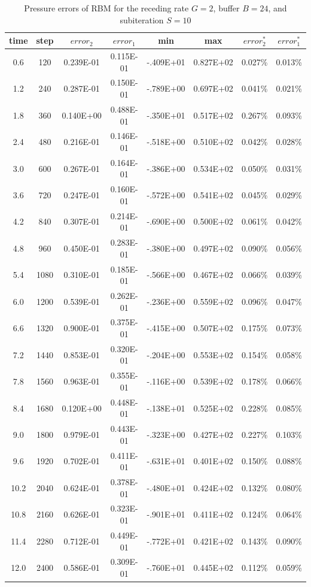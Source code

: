 \cp

 \begin{table}[hbtp]%
\vspace{0.6in}
 \begin{center}
\caption{Pressure errors of RBM for the receding rate $G=2$, buffer $B=24$, and subiteration $S=10$} %
\small
 \begin{tabular}{cccccccc} \hline %
 time & step & $error_{2}$ & $error_{1}$ &  min & max &  $error_{2}^*$ & $error_{1}^*$ \\ \hline
  0.6 &   120 & 0.239E-01 & 0.115E-01 & -.409E+01 & 0.827E+02 &   0.027\% &   0.013\%  \\
  1.2 &   240 & 0.287E-01 & 0.150E-01 & -.789E+00 & 0.697E+02 &   0.041\% &   0.021\%  \\
  1.8 &   360 & 0.140E+00 & 0.488E-01 & -.350E+01 & 0.517E+02 &   0.267\% &   0.093\%  \\
  2.4 &   480 & 0.216E-01 & 0.146E-01 & -.518E+00 & 0.510E+02 &   0.042\% &   0.028\%  \\
  3.0 &   600 & 0.267E-01 & 0.164E-01 & -.386E+00 & 0.534E+02 &   0.050\% &   0.031\%  \\
  3.6 &   720 & 0.247E-01 & 0.160E-01 & -.572E+00 & 0.541E+02 &   0.045\% &   0.029\%  \\
  4.2 &   840 & 0.307E-01 & 0.214E-01 & -.690E+00 & 0.500E+02 &   0.061\% &   0.042\%  \\
  4.8 &   960 & 0.450E-01 & 0.283E-01 & -.380E+00 & 0.497E+02 &   0.090\% &   0.056\%  \\
  5.4 &  1080 & 0.310E-01 & 0.185E-01 & -.566E+00 & 0.467E+02 &   0.066\% &   0.039\%  \\
  6.0 &  1200 & 0.539E-01 & 0.262E-01 & -.236E+00 & 0.559E+02 &   0.096\% &   0.047\%  \\
  6.6 &  1320 & 0.900E-01 & 0.375E-01 & -.415E+00 & 0.507E+02 &   0.175\% &   0.073\%  \\
  7.2 &  1440 & 0.853E-01 & 0.320E-01 & -.204E+00 & 0.553E+02 &   0.154\% &   0.058\%  \\
  7.8 &  1560 & 0.963E-01 & 0.355E-01 & -.116E+00 & 0.539E+02 &   0.178\% &   0.066\%  \\
  8.4 &  1680 & 0.120E+00 & 0.448E-01 & -.138E+01 & 0.525E+02 &   0.228\% &   0.085\%  \\
  9.0 &  1800 & 0.979E-01 & 0.443E-01 & -.323E+00 & 0.427E+02 &   0.227\% &   0.103\%  \\
  9.6 &  1920 & 0.702E-01 & 0.411E-01 & -.631E+01 & 0.401E+02 &   0.150\% &   0.088\%  \\
 10.2 &  2040 & 0.624E-01 & 0.378E-01 & -.480E+01 & 0.424E+02 &   0.132\% &   0.080\%  \\
 10.8 &  2160 & 0.626E-01 & 0.323E-01 & -.901E+01 & 0.411E+02 &   0.124\% &   0.064\%  \\
 11.4 &  2280 & 0.712E-01 & 0.449E-01 & -.772E+01 & 0.421E+02 &   0.143\% &   0.090\%  \\
 12.0 &  2400 & 0.586E-01 & 0.309E-01 & -.760E+01 & 0.445E+02 &   0.112\% &   0.059\%  \\
 \hline
 \end{tabular}
 \label{tab:1}
 \end{center}
 \end{table}
\cp

